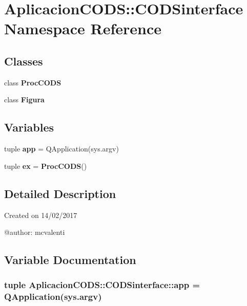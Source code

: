 \section{\-Aplicacion\-C\-O\-D\-S\-:\-:\-C\-O\-D\-Sinterface \-Namespace \-Reference}
\label{namespace_aplicacion_c_o_d_s_1_1_c_o_d_sinterface}
\subsection*{\-Classes}
\begin{DoxyCompactItemize}
\item 
class {\bf \-Proc\-C\-O\-D\-S}
\item 
class {\bf \-Figura}
\end{DoxyCompactItemize}
\subsection*{\-Variables}
\begin{DoxyCompactItemize}
\item 
tuple {\bf app} = \-Q\-Application(sys.\-argv)
\item 
tuple {\bf ex} = {\bf \-Proc\-C\-O\-D\-S}()
\end{DoxyCompactItemize}


\subsection{\-Detailed \-Description}
\begin{DoxyVerb}
Created on 14/02/2017

@author: mcvalenti
\end{DoxyVerb}
 

\subsection{\-Variable \-Documentation}
\subsubsection[{app}]{\setlength{\rightskip}{0pt plus 5cm}tuple {\bf \-Aplicacion\-C\-O\-D\-S\-::\-C\-O\-D\-Sinterface\-::app} = \-Q\-Application(sys.\-argv)}\label{namespace_aplicacion_c_o_d_s_1_1_c_o_d_sinterface_a3914593d7f5e7508104b2eb9bd56238f}


